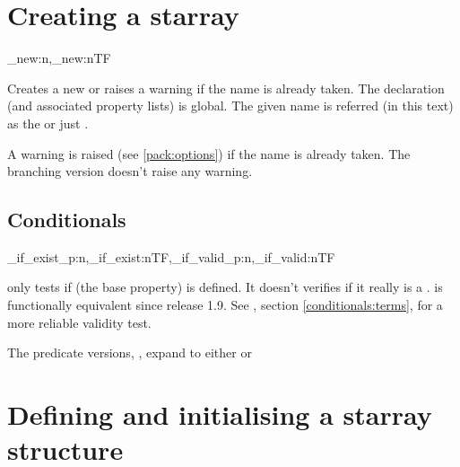 \documentclass[10pt]{article}
\begin{document}
\section{Creating a starray}\label{pack:new}
\begin{codedescribe}{\starray_new:n,\starray_new:nTF}
\begin{codesyntax}%
\end{codesyntax}
Creates a new  or raises a warning  if the name is already taken. The declaration (and associated property lists) is global. The given name is referred (in this text) as the  or just . 
\end{codedescribe}
\begin{tsremark}
  A warning is raised (see \ref{pack:options}) if the name is already taken. The branching version doesn't raise any warning.
\end{tsremark}

\subsection{Conditionals}\label{conditionals:exist}
\begin{codedescribe}[code,EXP,new=2023/05/20,update=2024/03/28]{\starray_if_exist_p:n,\starray_if_exist:nTF,\starray_if_valid_p:n,\starray_if_valid:nTF}
\begin{codesyntax}%
\end{codesyntax}
 only tests if  (the base property) is defined. It doesn't verifies if it really is a  .  is functionally equivalent since release 1.9. See , section \ref{conditionals:terms}, for a more reliable validity test.
\end{codedescribe}
\begin{tsremark}
The predicate versions, , expand to either  or 
\end{tsremark}

\section{Defining and initialising a starray structure}\label{pack:def}
\end{document}
